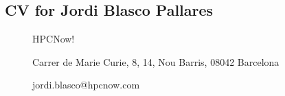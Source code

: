 
\subsection{CV for Jordi Blasco Pallares}
\begin{description}
\item[] HPCNow!
\item[] Carrer de Marie Curie, 8, 14, Nou Barris, 08042 Barcelona
\item[] jordi.blasco@hpcnow.com
\end{description}

